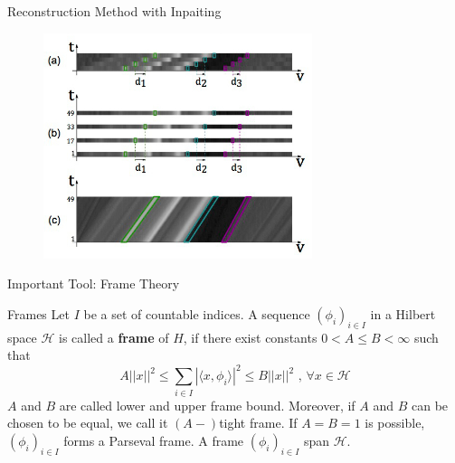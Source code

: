 \begin{frame}{Reconstruction Method with Inpaiting}
\begin{block}{}
\begin{figure}[h!]
\includegraphics[width=0.7\textwidth]{../../Diagrams/sparse_EPI.jpg}
\end{figure}
\end{block}
\end{frame}

\begin{frame}{Important Tool: Frame Theory}
\begin{block}{Frames}
Let $I$ be a set of countable indices. A sequence $(\phi_i)_{i\in I}$ in a Hilbert space $\mathcal{H}$ is called a \textbf{frame} of $H$, if there exist constants $0< A\leq B<\infty$ such that
$$
A||x||^2\leq\sum_{i\in I}|\langle x,\phi_i\rangle|^2\leq B||x||^2 \text{  ,  } \forall x\in\mathcal{H}
$$
$A$ and $B$ are called lower and upper frame bound. Moreover, if $A$ and $B$ can be chosen to be equal, we call it $(A-)$tight frame. If $A=B=1$ is possible, $(\phi_i)_{i\in I}$ forms a Parseval frame. A frame $(\phi_i)_{i\in I}$ span $\mathcal{H}$. 
\end{block}
\end{frame}

